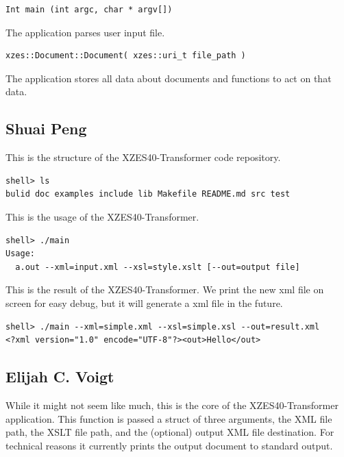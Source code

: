 \begin{lstlisting}
Int main (int argc, char * argv[])
\end{lstlisting}
The application parses user input file. 

\begin{lstlisting}
xzes::Document::Document( xzes::uri_t file_path )
\end{lstlisting}
The application stores all data about documents and functions to act on that data. 

\subsection{Shuai Peng}

This is the structure of the XZES40-Transformer code repository.

\begin{lstlisting}
shell> ls
bulid doc examples include lib Makefile README.md src test
\end{lstlisting}

This is the usage of the XZES40-Transformer.

\begin{lstlisting}
shell> ./main
Usage:
  a.out --xml=input.xml --xsl=style.xslt [--out=output file]
\end{lstlisting}

This is the result of the XZES40-Transformer. We print the new xml file on screen for easy debug, but it will generate a xml file in the future.

\begin{lstlisting}
shell> ./main --xml=simple.xml --xsl=simple.xsl --out=result.xml
<?xml version="1.0" encode="UTF-8"?><out>Hello</out>
\end{lstlisting}

\subsection{Elijah C. Voigt}

While it might not seem like much, this is the core of the XZES40-Transformer application.
This function is passed a struct of three arguments, the XML file path, the XSLT file path, and the (optional) output XML file destination.
For technical reasons it currently prints the output document to standard output.

